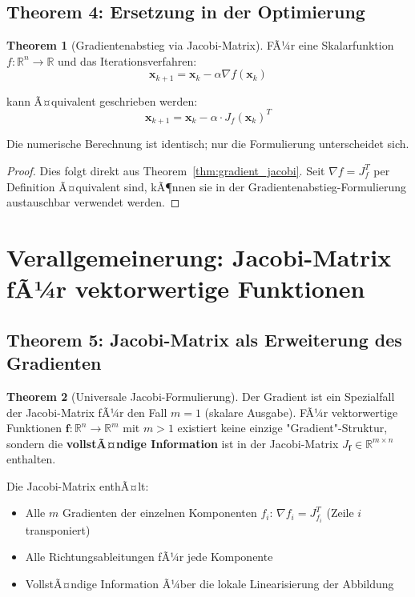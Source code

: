 ﻿\documentclass[a4paper,12pt]{article}
\theoremstyle{definition}
\newtheorem{theorem}{Theorem}
\begin{document}
\subsection{Theorem 4: Ersetzung in der Optimierung}

\begin{theorem}[Gradientenabstieg via Jacobi-Matrix]
	\label{thm:gd}
	FÃ¼r eine Skalarfunktion $f: \mathbb{R}^n \to \mathbb{R}$ und das Iterationsverfahren:
	\[
	\boldsymbol{x}_{k+1} = \boldsymbol{x}_k - \alpha \nabla f(\boldsymbol{x}_k)
	\]
	
	kann Ã¤quivalent geschrieben werden:
	\[
	\boldsymbol{x}_{k+1} = \boldsymbol{x}_k - \alpha \cdot J_f(\boldsymbol{x}_k)^T
	\]
	
	Die numerische Berechnung ist identisch; nur die Formulierung unterscheidet sich.
\end{theorem}

\begin{proof}
	Dies folgt direkt aus Theorem~\ref{thm:gradient_jacobi}. Seit $\nabla f = J_f^T$ per Definition Ã¤quivalent sind, kÃ¶nnen sie in der Gradientenabstieg-Formulierung austauschbar verwendet werden.
\end{proof}

\section{Verallgemeinerung: Jacobi-Matrix fÃ¼r vektorwertige Funktionen}

\subsection{Theorem 5: Jacobi-Matrix als Erweiterung des Gradienten}

\begin{theorem}[Universale Jacobi-Formulierung]
	\label{thm:universal}
	Der Gradient ist ein Spezialfall der Jacobi-Matrix fÃ¼r den Fall $m = 1$ (skalare Ausgabe). FÃ¼r vektorwertige Funktionen $\boldsymbol{f}: \mathbb{R}^n \to \mathbb{R}^m$ mit $m > 1$ existiert keine einzige "Gradient"-Struktur, sondern die \textbf{vollstÃ¤ndige Information} ist in der Jacobi-Matrix $J_{\boldsymbol{f}} \in \mathbb{R}^{m \times n}$ enthalten.
	
	Die Jacobi-Matrix enthÃ¤lt:
	\begin{itemize}
		\item Alle $m$ Gradienten der einzelnen Komponenten $f_i$: $\nabla f_i = J_{f_i}^T$ (Zeile $i$ transponiert)
		\item Alle Richtungsableitungen fÃ¼r jede Komponente
		\item VollstÃ¤ndige Information Ã¼ber die lokale Linearisierung der Abbildung
	\end{itemize}
\end{theorem}
\end{document}
